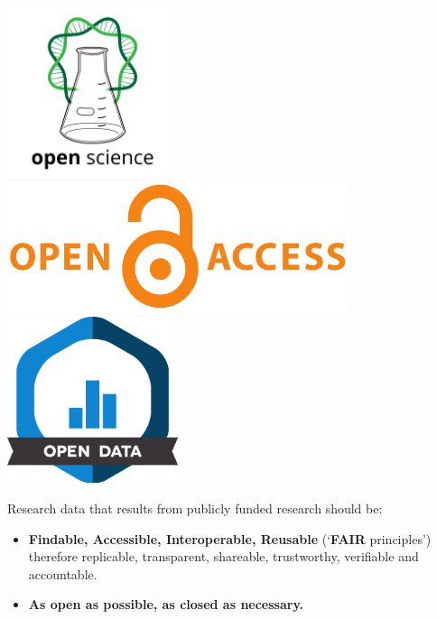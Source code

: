 \documentclass[a0,portrait]{a0poster}
\begin{document}
\begin{multicols}{3}
\includegraphics[width=5cm]{Poster TEX/style/Open Science.png} 
\hspace{\fill} 
\includegraphics[width=10cm]{Poster TEX/style/Open access (4).png}
\hspace{\fill} 
\includegraphics[width=5cm]{Poster TEX/style/Open data.png}

Research data that results from publicly funded research should be:

\begin{itemize}
\item \textbf{Findable, Accessible, Interoperable, Reusable} (‘\textbf{FAIR} principles’) \cite{2022_EUA} \cite{EU_2018-790}
 therefore replicable, transparent, shareable, trustworthy, verifiable and accountable.
\item \textbf{As open as possible, as closed as necessary.}
\end{itemize}
\color{black}



\end{multicols}
\end{document}
